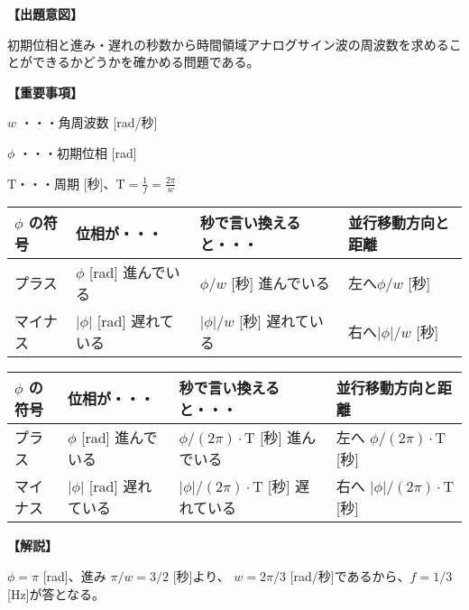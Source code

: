\noindent \textbf{【出題意図】}

\noindent 初期位相と進み・遅れの秒数から時間領域アナログサイン波の周波数を求めることができるかどうかを確かめる問題である。

\vspace{1em}
\noindent \textbf{【重要事項】}

\bigskip
\noindent $w$ ・・・角周波数 [rad/秒]

\bigskip
\noindent $\phi$ ・・・初期位相 [rad]

\bigskip
$\textrm{T}$・・・周期 [秒]、$\textrm{T} = \frac{1}{f} = \frac{2\pi}{w}$

\begin{center}
\begin{tabularx}{0.9\fbwidth}{|X|X|X|X|}
\hline
$\phi$ の符号&  位相が・・・   & 秒で言い換えると・・・   & 並行移動方向と距離 \\
\hline
プラス &  $\phi$ [rad] 進んでいる & $\phi/w$ [秒] 進んでいる & 左へ$\phi/w$ [秒] \\
\hline
マイナス &  $|\phi|$ [rad] 遅れている & $|\phi|/w$ [秒] 遅れている & 右へ$|\phi|/w$ [秒] \\
\hline
\end{tabularx}

\medskip
\begin{tabularx}{0.9\fbwidth}{|X|X|X|X|}
\hline
$\phi$ の符号&  位相が・・・   & 秒で言い換えると・・・   & 並行移動方向と距離 \\
\hline
プラス &  $\phi$ [rad] 進んでいる & $\phi/(2\pi) \cdot \textrm{T}$ [秒] 進んでいる & 左へ $\phi/(2\pi) \cdot \textrm{T}$ [秒] \\
\hline
マイナス &  $|\phi|$ [rad] 遅れている & $|\phi|/(2\pi) \cdot \textrm{T}$ [秒] 遅れている & 右へ $|\phi|/(2\pi) \cdot \textrm{T}$ [秒] \\
\hline
\end{tabularx}
\end{center}

\vspace{1em}
\noindent \textbf{【解説】}

\noindent $\phi = \pi$ [rad]、進み $\pi/w = 3/2$ [秒]より、 $w = 2\pi/3$ [rad/秒]であるから、$f = 1/3$ [Hz]が答となる。
